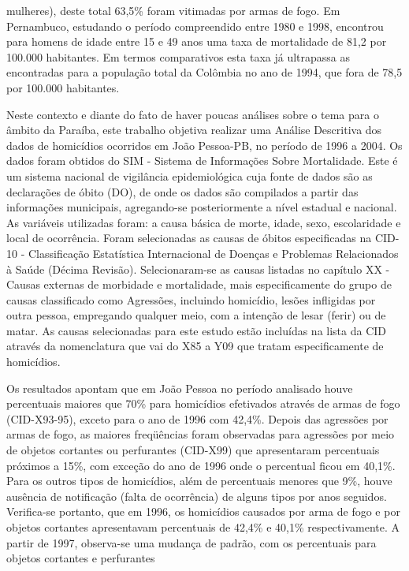 \documentclass[12pt]{article}
\begin{document}
mulheres), deste total 63,5\% foram vitimadas por armas de fogo. Em Pernambuco,  estudando o período compreendido entre
1980 e 1998, encontrou para homens de idade entre 15 e 49 anos uma taxa de mortalidade de
81,2 por 100.000 habitantes. Em termos comparativos esta taxa já ultrapassa as encontradas
para a população total da Colômbia no ano de 1994, que fora de 78,5 por 100.000 habitantes.
\par Neste contexto e diante do fato de haver poucas análises sobre o tema para o âmbito da
Paraíba, este trabalho objetiva realizar uma Análise Descritiva dos dados de homicídios
ocorridos em João Pessoa-PB, no período de 1996 a 2004. Os dados foram obtidos do SIM -
Sistema de Informações Sobre Mortalidade. Este é um sistema nacional de vigilância
epidemiológica cuja fonte de dados são as declarações de óbito (DO), de onde os dados são
compilados a partir das informações municipais, agregando-se posteriormente a nível estadual
e nacional. As variáveis utilizadas foram: a causa básica de morte, idade, sexo, escolaridade e
local de ocorrência. Foram selecionadas as causas de óbitos especificadas na CID-10 -
Classificação Estatística Internacional de Doenças e Problemas Relacionados à Saúde
(Décima Revisão). Selecionaram-se as causas listadas no capítulo XX - Causas externas de
morbidade e mortalidade, mais especificamente do grupo de causas classificado como
Agressões, incluindo homicídio, lesões infligidas por outra pessoa, empregando qualquer
meio, com a intenção de lesar (ferir) ou de matar. As causas selecionadas para este estudo
estão incluídas na lista da CID através da nomenclatura que vai do X85 a Y09 que tratam
especificamente de homicídios.
\par Os resultados apontam que em João Pessoa no período analisado houve percentuais maiores
que 70\% para homicídios efetivados através de armas de fogo (CID-X93-95), exceto para o
ano de 1996 com 42,4\%. Depois das agressões por armas de fogo, as maiores freqüências
foram observadas para agressões por meio de objetos cortantes ou perfurantes (CID-X99) que
apresentaram percentuais próximos a 15\%, com exceção do ano de 1996 onde o percentual
ficou em 40,1\%. Para os outros tipos de homicídios, além de percentuais menores que 9\%,
houve ausência de notificação (falta de ocorrência) de alguns tipos por anos seguidos.
Verifica-se portanto, que em 1996, os homicídios causados por arma de fogo e por objetos
cortantes apresentavam percentuais de 42,4\% e 40,1\% respectivamente. A partir de 1997,
observa-se uma mudança de padrão, com os percentuais para objetos cortantes e perfurantes
\end{document}
